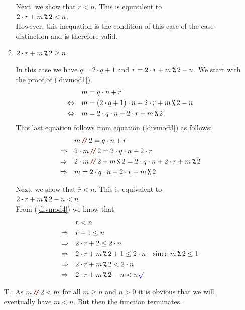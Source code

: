 \begin{enumerate}
\begin{enumerate}
    Next, we show that $\bar{r} < n$.  This is equivalent to
    \\[0.2cm]
    \hspace*{1.3cm}
    $2 \cdot r + m \mmod 2 < n$.
    \\[0.2cm]
    However, this inequation is the condition of this case of the case distinction and is therefore valid. \mycheck
  \item $2 \cdot r + m \mmod 2 \geq n$

    In this case we have $\bar{q} = 2 \cdot q + 1$ and $\bar{r} = 2 \cdot r + m \mmod 2 - n$.
    We start with the proof of (\ref{divmod1}).
    \begin{align*}
                           & m = \bar{q} \cdot n + \bar{r} \\
      \Leftrightarrow\quad & m = (2 \cdot q + 1) \cdot n + 2 \cdot r + m \mmod 2 - n \\
      \Leftrightarrow\quad & m = 2 \cdot q \cdot n + 2 \cdot r + m \mmod 2 
    \end{align*}
    This last equation follows from equation (\ref{divmod3}) as follows:
    \begin{align*}
                       & m \dv 2 = q \cdot n + r \\
      \Rightarrow\quad & 2 \cdot m \dv 2 = 2 \cdot q \cdot n + 2 \cdot r \\
      \Rightarrow\quad & 2 \cdot m \dv 2 + m \mmod 2 = 2 \cdot q \cdot n + 2 \cdot r + m \mmod 2 \\
      \Rightarrow\quad & m = 2 \cdot q \cdot n + 2 \cdot r + m \mmod 2 
    \end{align*}

    Next, we show that $\bar{r} < n$. This is equivalent to
    \\[0.2cm]
    \hspace*{1.3cm}
    $2 \cdot r + m \mmod 2 - n < n$
    \\[0.2cm]
    From (\ref{divmod4}) we know that
    \begin{align*}
                       & r < n \\
      \Rightarrow\quad & r + 1 \leq n \\
      \Rightarrow\quad & 2 \cdot r + 2 \leq 2 \cdot n \\
      \Rightarrow\quad & 2 \cdot r + m \mmod 2 + 1 \leq 2 \cdot n \quad \mbox{since $m \mmod 2 \leq 1$} \\
      \Rightarrow\quad & 2 \cdot r + m \mmod 2 < 2 \cdot n \\
      \Rightarrow\quad & 2 \cdot r + m \mmod 2 - n < n \green{\surd}
    \end{align*}
  \end{enumerate}
\item[T.:] As $m \dv 2 < m$ for all $m \geq n$ and $n > 0$ it is obvious that we will eventually have
  $m  < n$. But then the function  terminates.
\end{enumerate}

